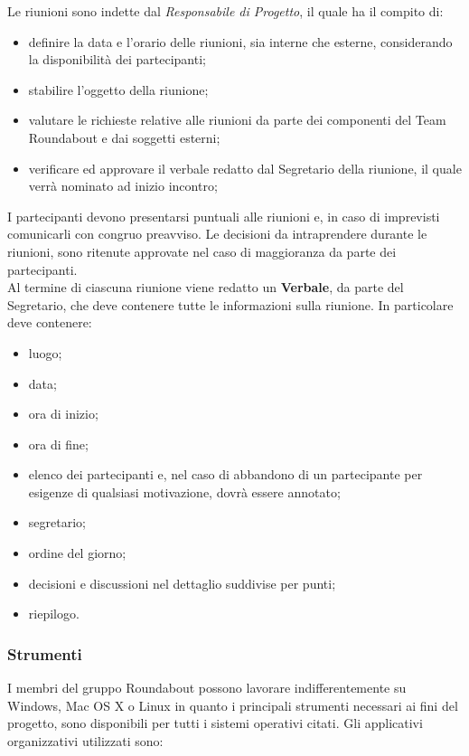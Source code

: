 				Le riunioni sono indette dal \textit{Responsabile di Progetto}, il quale ha il compito di:
				\begin{itemize}
					\item definire la data e l'orario delle riunioni, sia interne che esterne, considerando la disponibilità dei partecipanti;
					\item stabilire l'oggetto della riunione;
					\item valutare le richieste relative alle riunioni da parte dei componenti del Team Roundabout e dai soggetti esterni;
					\item verificare ed approvare il verbale redatto dal Segretario della riunione, il quale verrà nominato ad inizio incontro;
				\end{itemize}
				I partecipanti devono presentarsi puntuali alle riunioni e, in caso di imprevisti comunicarli con congruo preavviso.
				Le decisioni da intraprendere durante le riunioni, sono ritenute approvate nel caso di maggioranza da parte dei partecipanti.\\
				Al termine di ciascuna riunione viene redatto un \textbf{Verbale}, da parte del Segretario, che deve contenere tutte le informazioni sulla riunione. In particolare deve contenere:
				\begin{itemize}
					\item luogo;
					\item data;
					\item ora di inizio;
					\item ora di fine;
					\item elenco dei partecipanti e, nel caso di abbandono di un partecipante per esigenze di qualsiasi motivazione, dovrà essere annotato;
					\item segretario;
					\item ordine del giorno;
					\item decisioni e discussioni nel dettaglio suddivise per punti;
					\item riepilogo.
				\end{itemize}
		
		
		\subsubsection{Strumenti}
			I membri del gruppo Roundabout possono lavorare indifferentemente su Windows, Mac OS X o Linux in quanto i principali strumenti necessari ai fini del progetto, sono disponibili per tutti i sistemi operativi citati. Gli applicativi organizzativi utilizzati sono:
			
